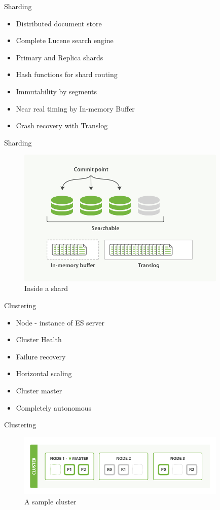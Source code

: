 \documentclass[10pt]{beamer}
\begin{document}
\begin{frame}{Sharding}
	\begin{itemize}
		\item Distributed document store
		\item Complete Lucene search engine
		\item Primary and Replica shards
		\item Hash functions for shard routing
		\item Immutability by segments
		\item Near real timing by In-memory Buffer
		\item Crash recovery with Translog
	\end{itemize}
\end{frame}

\begin{frame}{Sharding}
	\begin{figure}
		\centering\includegraphics[width=10cm]{inside_shard}
		\caption{Inside a shard}
	\end{figure}
\end{frame}

\begin{frame}{Clustering}
	\begin{itemize}
		\item Node - instance of ES server
		\item Cluster Health
		\item Failure recovery
		\item Horizontal scaling
		\item Cluster master
		\item Completely autonomous
	\end{itemize}
\end{frame}

\begin{frame}{Clustering}
	\begin{figure}
		\centering\includegraphics[width=10cm]{cluster}
		\caption{A sample cluster}
	\end{figure}
\end{frame}
\end{document}
